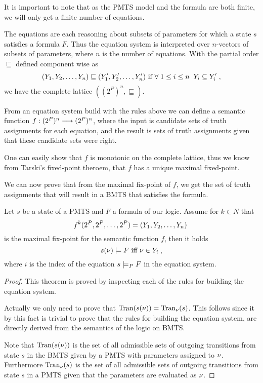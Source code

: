 It is important to note that as the PMTS model and the formula are both finite, we will only get a finite number of equations.

The equations are each reasoning about subsets of parameters for which a state $s$ satisfies a formula $F$. Thus the equation system is interpreted over $n$-vectors of subsets of parameters, where $n$ is the number of equations.
With the partial order $\sqsubseteq$ defined component wise as
\[
	(Y_1,Y_2,\ldots,Y_n) \sqsubseteq 	(Y_1',Y_2',\ldots,Y_n') \text{  if  } \forall \; 1\leq i \leq n \;\; Y_i \subseteq Y_i'\;,
\] 
we have the complete lattice $((2^P)^n,\sqsubseteq)$.

From an equation system build with the rules above we can define a semantic function $f:(2^P)^n \stackrel{}{\longrightarrow} (2^P)^n$, where the input is candidate sets of truth assignments for each equation, and the result is sets of truth assignments given that these candidate sets were right. 

One can easily show that $f$ is monotonic on the complete lattice, thus we know from Tarski's fixed-point theroem, that $f$ has a unique maximal fixed-point. 

We can now prove that from the maximal fix-point of $f$, we get the set of truth assignments that will result in a BMTS that satisfies the formula. 

\begin{theorem}
	Let $s$ be a state of a PMTS and $F$ a formula of our logic. Assume for $k \in N$ that 
	\[
	f^k(2^P,2^P,\ldots,2^P)=(Y_1,Y_2,\ldots,Y_n)\; 
	\]
	is the maximal fix-point for the semantic function $f$,
	then it holds 
	\[
		s(\nu) \models F \text{ iff } \nu \in Y_i\;,
	\]where $i$ is the index of the equation $s \models_P F$ in the equation system.
\end{theorem}
\begin{proof}
This theorem is proved by inspecting each of the rules for building the equation system. 

Actually we only need to prove that $\mathrm{Tran} (s(\nu)) = \mathrm{Tran}_\nu(s)$. 
This follows since it by this fact is trivial to prove that the rules for building the equation system, are directly derived from the semantics of the logic on BMTS.

Note that $\mathrm{Tran} (s(\nu))$ is the set of all admissible sets of outgoing transitions from state $s$ in the BMTS given by a PMTS with parameters assigned to $\nu$. Furthermore $\mathrm{Tran}_\nu(s)$ is the set of all admissible sets of outgoing transitions from state $s$ in a PMTS given that the parameters are evaluated as $\nu$.
\end{proof}
